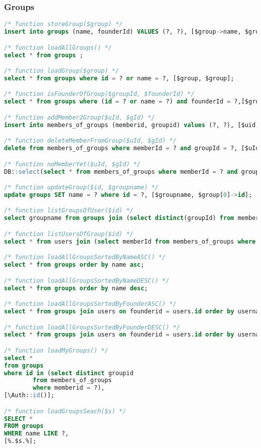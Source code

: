 \subsubsection{Groups}
\begin{lstlisting}[language=sql]
/* function storeGroup($group) */
insert into groups (name, founderId) VALUES (?, ?), [$group->name, $group->founderId];

/* function loadAllGroups() */
select * from groups ;

/* function loadGroup($group) */
select * from groups where id = ? or name = ?, [$group, $group];

/* function isFounderOfGroup($groupId, $founderId) */
select * from groups where (id = ? or name = ?) and founderId = ?,[$groupId, $groupId, $founderId];

/* function addMember2Group($uId, $gId) */
insert into members_of_groups (memberid, groupid) values (?, ?), [$uid, $group[0]->id];

/* function deleteMemberFromGroup($uId, $gId) */
delete from members_of_groups where memberId = ? and groupId = ?, [$uId, $group[0]->id];

/* function noMemberYet($uId, $gId) */
DB::select(select * from members_of_groups where memberId = ? and groupId = ?,[$uId, $group[0]->id];

/* function updateGroup($id, $groupname) */
update groups SET name = ? where id = ?, [$groupname, $group[0]->id];

/* function listGroupsOfUser($id) */
select groupname from groups join (select distinct(groupId) from members_of_groups where memberId = ?) agg on id=groupId, [$id];

/* function listUsersOfGroup($id) */
select * from users join (select memberId from members_of_groups where groupId = ?) agg on id=memberId, [$id];

/* function loadAllGroupsSortedByNameASC() */
select * from groups order by name asc;

/* function loadAllGroupsSortedByNameDESC() */
select * from groups order by name desc;

/* function loadAllGroupsSortedByFounderASC() */
select * from groups join users on founderid = users.id order by username asc;

/* function loadAllGroupsSortedByFounderDESC() */
select * from groups join users on founderid = users.id order by username desc;

/* function loadMyGroups() */
select *
from groups
where id in (select distinct groupid
        from members_of_groups
        where memberid = ?),
[\Auth::id()];

/* function loadGroupsSeach($s) */
SELECT *
FROM groups
WHERE name LIKE ?,
[%.$s.%];

\end{lstlisting}
